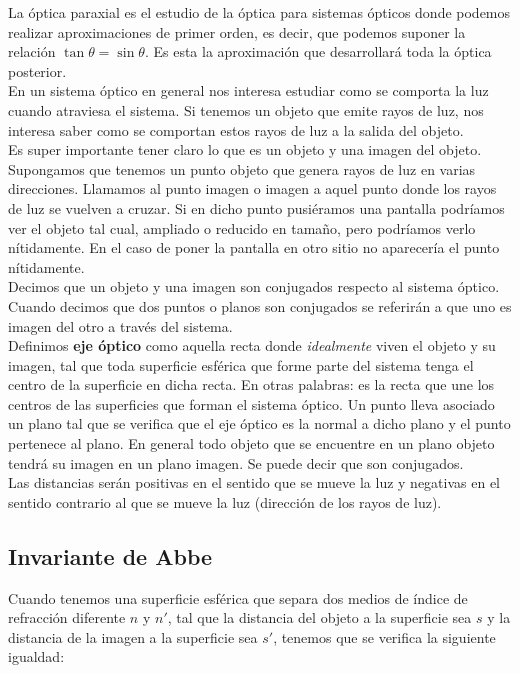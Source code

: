\documentclass[12pt]{article}
\numberwithin{equation}{section}
\numberwithin{figure}{section}
\begin{document}
La óptica paraxial es el estudio de la óptica para sistemas ópticos donde podemos realizar aproximaciones de primer orden, es decir, que podemos suponer la relación $\tan \theta = \sin \theta$. Es esta la aproximación que desarrollará toda la óptica posterior.\\

En un sistema óptico en general nos interesa estudiar como se comporta la luz cuando atraviesa el sistema. Si tenemos un objeto que emite rayos de luz, nos interesa saber como se comportan estos rayos de luz a la salida del objeto. \\

Es super importante tener claro lo que es un objeto y una imagen del objeto. Supongamos que tenemos un punto objeto que genera rayos de luz en varias direcciones. Llamamos al punto imagen o imagen a aquel punto donde los rayos de luz se vuelven a cruzar. Si en dicho punto pusiéramos una pantalla podríamos ver el objeto tal cual, ampliado o reducido en tamaño, pero podríamos verlo nítidamente. En el caso de poner la pantalla en otro sitio no aparecería el punto nítidamente. \\

Decimos que un objeto y una imagen son conjugados respecto al sistema óptico. Cuando decimos que dos puntos o planos son conjugados se referirán a que uno es imagen del otro a través del sistema. \\

Definimos \textbf{eje óptico} como aquella recta donde \textit{idealmente} viven el objeto y su imagen, tal que toda superficie esférica que forme parte del sistema tenga el centro de la superficie en dicha recta. En otras palabras: es la recta que une los centros de las superficies que forman el sistema óptico. Un punto lleva asociado un plano tal que se verifica que el eje óptico es la normal a dicho plano y el punto pertenece al plano. En general todo objeto que se encuentre en un plano objeto tendrá su imagen en un plano imagen. Se puede decir que son conjugados. \\

Las distancias serán positivas en el sentido que se mueve la luz y negativas en el sentido contrario al que se mueve la luz (dirección de los rayos de luz).

\subsection{Invariante de Abbe}

Cuando tenemos una superficie esférica que separa dos medios de índice de refracción diferente $n$ y $n'$, tal que la distancia del objeto a la superficie sea $s$ y la distancia de la imagen a la superficie sea $s'$, tenemos que se verifica la siguiente igualdad:
\end{document}
